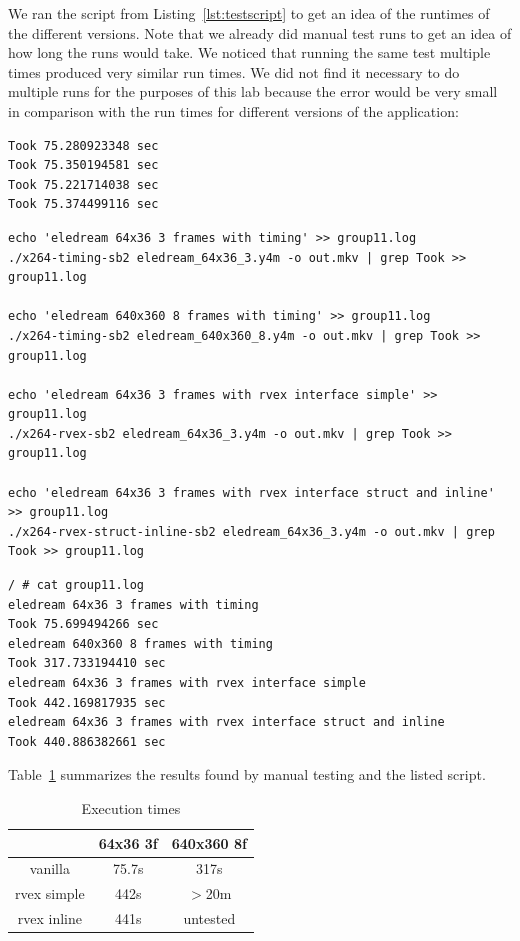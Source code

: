 \documentclass{article}
\begin{document}
We ran the script from Listing~\ref{lst:testscript} to get an idea of the runtimes of the different versions.
Note that we already did manual test runs to get an idea of how long the runs would take.
We noticed that running the same test multiple times produced very similar run times.
We did not find it necessary to do multiple runs for the purposes of this lab because the error would be very small in comparison with the run times for different versions of the application:

\begin{verbatim}
Took 75.280923348 sec
Took 75.350194581 sec
Took 75.221714038 sec
Took 75.374499116 sec
\end{verbatim}

\begin{lstlisting}[style=bash,caption=Test script,label=lst:testscript]
echo 'eledream 64x36 3 frames with timing' >> group11.log
./x264-timing-sb2 eledream_64x36_3.y4m -o out.mkv | grep Took >> group11.log

echo 'eledream 640x360 8 frames with timing' >> group11.log
./x264-timing-sb2 eledream_640x360_8.y4m -o out.mkv | grep Took >> group11.log

echo 'eledream 64x36 3 frames with rvex interface simple' >> group11.log
./x264-rvex-sb2 eledream_64x36_3.y4m -o out.mkv | grep Took >> group11.log

echo 'eledream 64x36 3 frames with rvex interface struct and inline' >> group11.log
./x264-rvex-struct-inline-sb2 eledream_64x36_3.y4m -o out.mkv | grep Took >> group11.log
\end{lstlisting}

\begin{lstlisting}[style=bash,caption=Test output,label=lst:testoutput]
/ # cat group11.log
eledream 64x36 3 frames with timing
Took 75.699494266 sec
eledream 640x360 8 frames with timing
Took 317.733194410 sec
eledream 64x36 3 frames with rvex interface simple
Took 442.169817935 sec
eledream 64x36 3 frames with rvex interface struct and inline
Took 440.886382661 sec
\end{lstlisting}

Table~\ref{tab:exe-times} summarizes the results found by manual testing and the listed script.

\begin{table}[!h]
    \centering
    \caption{Execution times}
    \label{tab:exe-times}
    \begin{tabular}{|c|c|c|}
       \hline
                   & 64x36 3f & 640x360 8f \\ \hline
       vanilla     & 75.7s    & 317s       \\
       rvex simple & 442s     & $>$20m     \\
       rvex inline & 441s     & untested   \\
       \hline
    \end{tabular}
\end{table}
\end{document}
